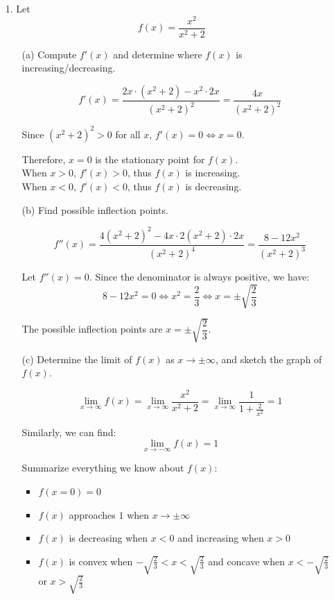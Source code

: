\documentclass{article}
\begin{document}
\begin{enumerate}
    
    \item[1.] Let $$ f(x) = \frac{ x^2 }{ x^2 + 2 } $$
    
        \begin{enumerate}
            \item[(a)] Compute $f'(x)$ and determine where $f(x)$ is increasing/decreasing.
            
            $$ f'(x) = \frac{ 2x \cdot (x^2+2) - x^2 \cdot 2x }{ (x^2+2)^2 } = \frac{ 4x }{ (x^2+2)^2 } $$
            
            Since $(x^2+2)^2 > 0$ for all $x$, $f'(x)=0 \Leftrightarrow x=0 $.
            
            Therefore, $x=0$ is the stationary point for $f(x)$. \\
            
            When $x>0$, $f'(x)>0$, thus $f(x)$ is increasing.\\
            When $x<0$, $f'(x)<0$, thus $f(x)$ is decreasing. \\
            
            \item[(b)] Find possible inflection points.
            
            $$ f''(x) = \frac{ 4(x^2+2)^2 - 4x \cdot 2(x^2+2) \cdot 2x }{ (x^2+2)^4 } = \frac{ 8-12x^2 }{ (x^2+2)^3 } $$
            
            Let $f''(x) = 0$. Since the denominator is always positive, we have:
            $$  8-12x^2 = 0 \Leftrightarrow x^2 = \frac{2}{3} \Leftrightarrow x = \pm\sqrt{\frac{2}{3}} $$
            
            The possible inflection points are $x = \pm\sqrt{\dfrac{2}{3}}$.
            
            \item[(c)] Determine the limit of $f(x)$ as $x \rightarrow \pm\infty$, and sketch the graph of $f(x)$.
            
            $$ \lim_{x \rightarrow \infty}{f(x)} = \lim_{x \rightarrow \infty}{ \frac{x^2}{x^2+2} } 
               = \lim_{x \rightarrow \infty}{ \frac{1}{1+\frac{2}{x^2}} } = 1 $$
               
            Similarly, we can find:
            $$ \lim_{x \rightarrow -\infty}{f(x)} = 1 $$
            
            Summarize everything we know about $f(x)$:
            \begin{itemize}
                \item $f(x=0) = 0$
                \item $f(x)$ approaches $1$ when $x \rightarrow \pm\infty$
                \item $f(x)$ is decreasing when $x<0$ and increasing when $x>0$
                \item $f(x)$ is convex when $-\sqrt{\frac{2}{3}}<x<\sqrt{\frac{2}{3}}$ and concave when $x<-\sqrt{\frac{2}{3}}$ or $x>\sqrt{\frac{2}{3}}$
            \end{itemize}
            

\end{enumerate}
\end{enumerate}
\end{document}
